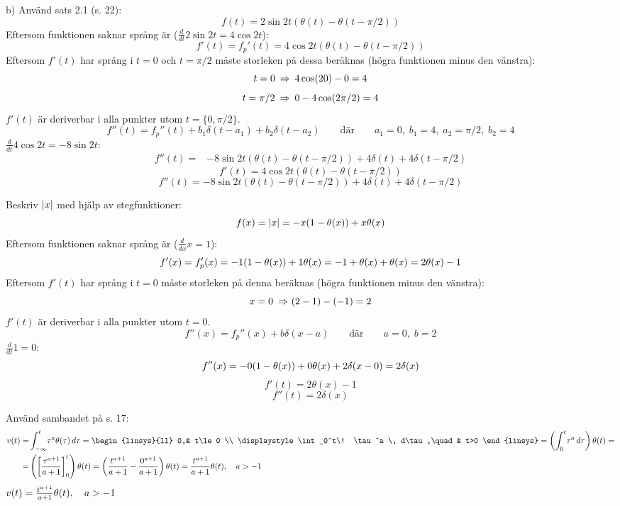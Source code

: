 \begin{task}{b)}
	Använd sats 2.1 (s. 22):
	\[f(t)= 2\sin 2t(\theta(t)-\theta(t-\pi/2))\]
	Eftersom funktionen saknar språng är ($\frac{d}{dt}2\sin 2t=4\cos2t$):
	\[f'(t)=f_p'(t)=4\cos2t(\theta(t)-\theta(t-\pi/2))\]
	Eftersom $f'(t)$ har språng i $t=0$ och $t=\pi/2$ måste storleken på dessa beräknas (högra funktionen minus den vänstra):
	\[t=0 \ra 4\cos(2\*0)-0=4\]
	\[t=\pi/2 \ra 0-4\cos(2\*\pi/2)=4\]
	$f'(t)$ är deriverbar i alla punkter utom $t=\{0,\pi/2\}$.
	\[f''(t)=f_p''(t)+b_1\delta(t-a_1)+b_2\delta(t-a_2) \qquad\text{där}\qquad a_1=0,\;b_1=4,\;a_2=\pi/2,\;b_2=4\]
	$\frac{d}{dt}4\cos2t=-8\sin2t$:
	\begin{align*}
	f''(t)=
	&-8\sin2t(\theta(t)-\theta(t-\pi/2))+4\delta(t)+4\delta(t-\pi/2)
	\end{align*}
	\ans 
	\[f'(t)=4\cos2t(\theta(t)-\theta(t-\pi/2))\]
	\[f''(t)=-8\sin2t(\theta(t)-\theta(t-\pi/2))+4\delta(t)+4\delta(t-\pi/2)\]
\end{task}

\begin{task}{2.11}
	Beskriv $\left|x\right|$ med hjälp av stegfunktioner:
	\[f(x) = \left|x\right| = -x(1-\theta(x))+x\theta(x)\]
	Eftersom funktionen saknar språng är ($\frac{d}{dx}x=1$):
	\[f'(x)=f_p'(x) = -1\*(1-\theta(x))+1\*\theta(x) = -1+\theta(x)+\theta(x) = 2\theta(x)-1\]
	Eftersom $f'(t)$ har språng i $t=0$ måste storleken på denna beräknas (högra funktionen minus den vänstra):
	\[x=0 \ra (2-1)-(-1)=2\]
	$f'(t)$ är deriverbar i alla punkter utom $t=0$.
	\[f''(x)=f_p''(x)+b\delta(x-a)\qquad\text{där}\qquad a=0,\;b=2\]
	$\frac{d}{dt}1=0$:
	\[f''(x) = -0\*(1-\theta(x))+0\*\theta(x)+2\delta(x-0)=2\delta(x)\]
	\ans 
	\[f'(t)=2\theta(x)-1\]
	\[f''(t)=2\delta(x)\]
\end{task}

\begin{task}{2.12}
	Använd sambandet på s. 17:
	\begin{align*}
	v(t)=
	&\int_{-\infty}^{t} \! \tau^a\theta(\tau) \, d\tau =
	\begin{linsys}{ll}
		0,& t\le0 \\
		\displaystyle\int_0^t\! \tau^a \, d\tau,\quad & t>0
	\end{linsys}=
	\left(\int_0^t\! \tau^a \, d\tau\right)\theta(t)= \\ =
	&\left(\left[\frac{\tau^{a+1}}{a+1}\right]_0^t\right)\theta(t)=
	\left(\frac{t^{a+1}}{a+1}-\frac{0^{a+1}}{a+1}\right)\theta(t)=
	\frac{t^{a+1}}{a+1}\theta(t)\cond{a>-1}
	\end{align*}
	\ans $v(t)=\frac{t^{a+1}}{a+1}\theta(t), \quad a>-1$
\end{task}

